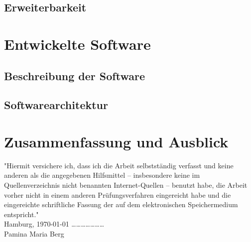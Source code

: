 \documentclass[paper=a4, pagesize, DIV=calc, BCOR=12.5mm, twoside=on, onecolumn=on, open = any, titlepage =on, parskip =half-, headsepline = on, footsepline = on, chapterprefix = on, appendixprefix = off, fontsize = 12pt, numbers = noenddot, abstract = on]{scrbook}
\numberwithin{equation}{chapter}
\theoremstyle{definition}
\theoremstyle{plain}
\theoremstyle{plain}
\theoremstyle{remark}
\theoremstyle{plain}
\theoremstyle{plain}
\begin{document}
\newpage
\par \singlespacing
\section{Erweiterbarkeit} \label{sec:erweiterbarkeit}
\onehalfspacing




\chapter{Entwickelte Software}



\section{Beschreibung der Software}



\section{Softwarearchitektur}

\newpage
\chapter{Zusammenfassung und Ausblick}

\newpage

\newpage
\thispagestyle{empty}
\vspace*{\fill}
"Hiermit versichere ich, dass ich die Arbeit selbstständig verfasst und keine anderen als die angegebenen Hilfsmittel – insbesondere keine im Quellenverzeichnis nicht benannten Internet-Quellen – benutzt habe, die Arbeit vorher nicht in einem anderen Prüfungsverfahren eingereicht habe und die eingereichte schriftliche Fassung der auf dem elektronischen Speichermedium entspricht."\\

Hamburg, \today \hspace*{\fill} \dots \dots \dots \dots \dots \dots \dots\\
\hspace*{\fill} Pamina Maria Berg $\,$
\end{document}
